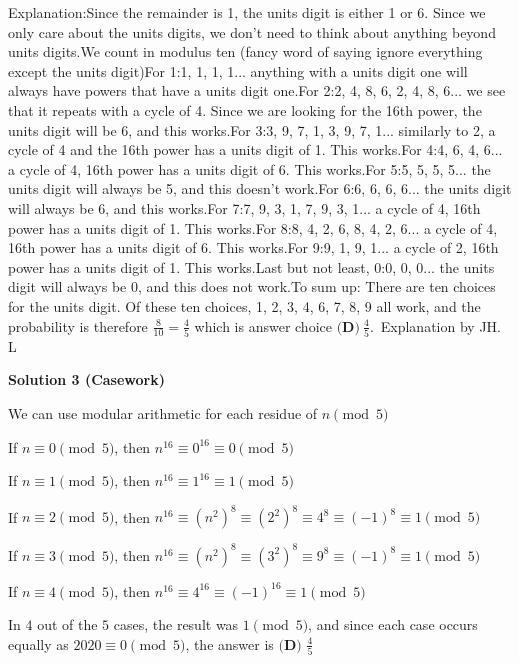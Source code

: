 \begin{enumerate}
 
Explanation:Since the remainder is 1, the units digit is either 1 or 6. Since we only care about the units digits, we don't need to think about anything beyond units digits.We count in modulus ten (fancy word of saying ignore everything except the units digit)For 1:1, 1, 1, 1... anything with a units digit one will always have powers that have a units digit one.For 2:2, 4, 8, 6, 2, 4, 8, 6... we see that it repeats with a cycle of 4. Since we are looking for the 16th power, the units digit will be 6, and this works.For 3:3, 9, 7, 1, 3, 9, 7, 1... similarly to 2, a cycle of 4 and the 16th power has a units digit of 1. This works.For 4:4, 6, 4, 6... a cycle of 4, 16th power has a units digit of 6. This works.For 5:5, 5, 5, 5... the units digit will always be 5, and this doesn't work.For 6:6, 6, 6, 6... the units digit will always be 6, and this works.For 7:7, 9, 3, 1, 7, 9, 3, 1... a cycle of 4, 16th power has a units digit of 1. This works.For 8:8, 4, 2, 6, 8, 4, 2, 6... a cycle of 4, 16th power has a units digit of 6. This works.For 9:9, 1, 9, 1... a cycle of 2, 16th power has a units digit of 1. This works.Last but not least, 0:0, 0, 0... the units digit will always be 0, and this does not work.To sum up: There are ten choices for the units digit. Of these ten choices, 1, 2, 3, 4, 6, 7, 8, 9 all work, and the probability is therefore $\frac{8}{10}=\frac{4}{5}$ which is answer choice $\boxed{\textbf{(D)}\ \frac{4}{5}}$.~Explanation by JH. L

 



\textbf{Solution 3 (Casework)}

We can use modular arithmetic for each residue of $n \pmod 5$

 


 If $n \equiv 0 \pmod 5$, then $n^{16} \equiv 0^{16} \equiv 0 \pmod 5$

 
If $n \equiv 1 \pmod 5$, then $n^{16} \equiv 1^{16} \equiv 1 \pmod 5$

 
If $n \equiv 2 \pmod 5$, then $n^{16} \equiv (n^2)^8 \equiv (2^2)^8 \equiv 4^8 \equiv (-1)^8 \equiv 1 \pmod 5$

 
If $n \equiv 3 \pmod 5$, then $n^{16} \equiv (n^2)^8 \equiv (3^2)^8 \equiv 9^8 \equiv (-1)^8 \equiv 1 \pmod 5$

 
If $n \equiv 4 \pmod 5$, then $n^{16} \equiv 4^{16} \equiv (-1)^{16} \equiv 1 \pmod 5$

 


 In $4$ out of the $5$ cases, the result was $1 \pmod 5$, and since each case occurs equally as $2020 \equiv 0 \pmod 5$, the answer is $\boxed{\textbf{(D) }\frac{4}{5}}$





\end{enumerate}
